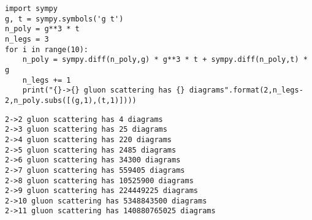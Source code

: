 \documentclass[11pt]{article}
\begin{document}
\begin{verbatim}
import sympy
g, t = sympy.symbols('g t')
n_poly = g**3 * t
n_legs = 3
for i in range(10):
    n_poly = sympy.diff(n_poly,g) * g**3 * t + sympy.diff(n_poly,t) * g
    n_legs += 1
    print("{}->{} gluon scattering has {} diagrams".format(2,n_legs-2,n_poly.subs([(g,1),(t,1)])))
\end{verbatim}

\label{}
\begin{verbatim}
2->2 gluon scattering has 4 diagrams
2->3 gluon scattering has 25 diagrams
2->4 gluon scattering has 220 diagrams
2->5 gluon scattering has 2485 diagrams
2->6 gluon scattering has 34300 diagrams
2->7 gluon scattering has 559405 diagrams
2->8 gluon scattering has 10525900 diagrams
2->9 gluon scattering has 224449225 diagrams
2->10 gluon scattering has 5348843500 diagrams
2->11 gluon scattering has 140880765025 diagrams
\end{verbatim}
\end{document}
